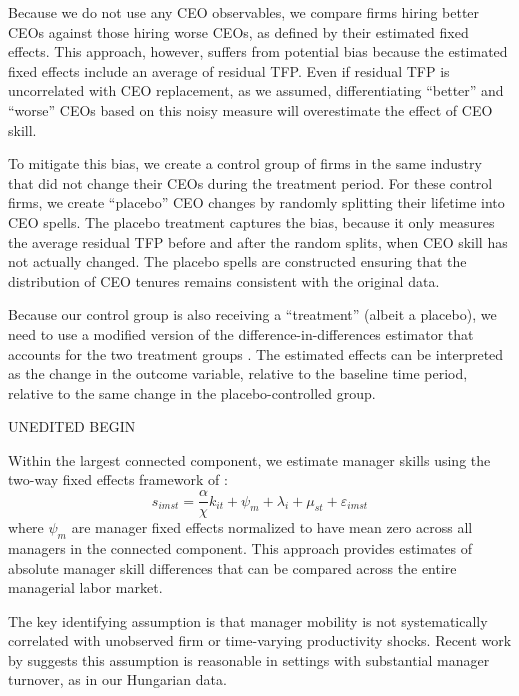 \documentclass[11pt,a4paper]{article}
\begin{document}
Because we do not use any CEO observables, we compare firms hiring better CEOs against those hiring worse CEOs, as defined by their estimated fixed effects. This approach, however, suffers from potential bias because the estimated fixed effects include an average of residual TFP. Even if residual TFP is uncorrelated with CEO replacement, as we assumed, differentiating ``better'' and ``worse'' CEOs based on this noisy measure will overestimate the effect of CEO skill.

To mitigate this bias, we create a control group of firms in the same industry that did not change their CEOs during the treatment period. For these control firms, we create ``placebo'' CEO changes by randomly splitting their lifetime into CEO spells. The placebo treatment captures the bias, because it only measures the average residual TFP before and after the random splits, when CEO skill has not actually changed.  The placebo spells are constructed ensuring that the distribution of CEO tenures remains consistent with the original data.

Because our control group is also receiving a ``treatment'' (albeit a placebo), we need to use a modified version of the difference-in-differences estimator \citep{Callaway2021JoLE} that accounts for the two treatment groups \citep{Koren2023expat,Koren2024xt2treatments}. The estimated effects can be interpreted as the change in the outcome variable, relative to the baseline time period, relative to the same change in the placebo-controlled group.

UNEDITED BEGIN

Within the largest connected component, we estimate manager skills using the two-way fixed effects framework of \citet{abowd1999high}:
\begin{equation}
s_{imst} = \frac{\alpha}{\chi} k_{it} + \psi_m + \lambda_i + \mu_{st} + \varepsilon_{imst}
\end{equation}
where $\psi_m$ are manager fixed effects normalized to have mean zero across all managers in the connected component. This approach provides estimates of absolute manager skill differences that can be compared across the entire managerial labor market.

The key identifying assumption is that manager mobility is not systematically correlated with unobserved firm or time-varying productivity shocks. Recent work by \citet{metcalfe2023managers} suggests this assumption is reasonable in settings with substantial manager turnover, as in our Hungarian data.
\end{document}
